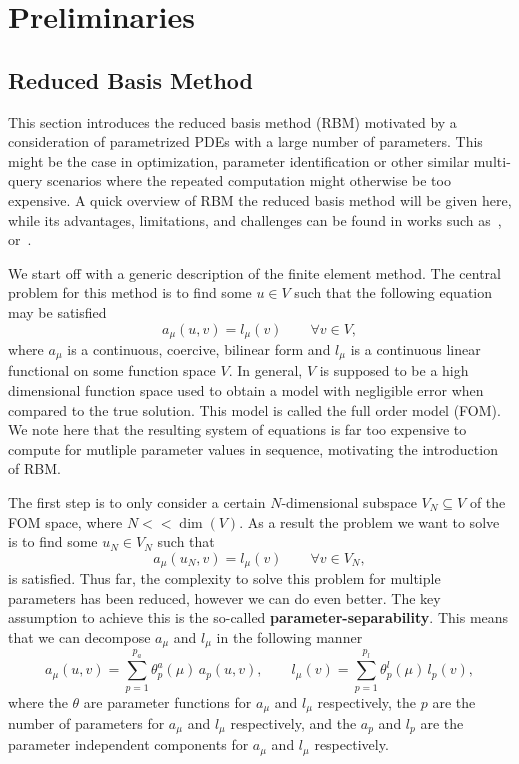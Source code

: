 \section{Preliminaries}\label{sec:Preliminaries}

\subsection{Reduced Basis Method}

This section introduces the reduced basis method (RBM) motivated by a consideration of parametrized PDEs with a large number of parameters.
This might be the case in optimization, parameter identification or other similar multi-query scenarios where the repeated computation might otherwise be too expensive.
A quick overview of RBM the reduced basis method will be given here, while its advantages, limitations, and challenges can be found in works such as~\cite{Ohlberger2015},~\cite{Quarteroni2015} or~\cite{Hesthaven2016}.

We start off with a generic description of the finite element method.
The central problem for this method is to find some $u \in V$ such that the following equation may be satisfied
\begin{equation}\label{FOMEq}
    a_\mu(u, v) = l_\mu(v) \qquad \forall v \in V,
\end{equation}
where $a_\mu$ is a continuous, coercive, bilinear form and $l_\mu$ is a continuous linear functional on some function space $V$.
In general, $V$ is supposed to be a high dimensional function space used to obtain a model with negligible error when compared to the true solution.
This model is called the full order model (FOM).
We note here that the resulting system of equations is far too expensive to compute for mutliple parameter values in sequence, motivating the introduction of RBM.\@

The first step is to only consider a certain $N$-dimensional subspace $V_N \subseteq V$ of the FOM space, where $N << \dim(V)$.
As a result the problem we want to solve is to find some $u_N \in V_N$ such that
\begin{equation}\label{ROMEq}
    a_\mu(u_N, v) = l_\mu(v) \qquad \forall v \in V_N,
\end{equation}
is satisfied.
Thus far, the complexity to solve this problem for multiple parameters has been reduced, however we can do even better.
The key assumption to achieve this is the so-called \textbf{parameter-separability}.
This means that we can decompose $a_\mu$ and $l_\mu$ in the following manner
\begin{equation}\label{ParamSep}
    a_\mu(u, v) = \sum\limits_{p = 1}^{p_a} \theta_p^a(\mu) \, a_p(u, v), \qquad l_\mu(v) = \sum\limits_{p = 1}^{p_l} \theta_p^l(\mu) \, l_p(v),
\end{equation}
where the $\theta$ are parameter functions for $a_\mu$ and $l_\mu$ respectively, the $p$ are the number of parameters for $a_\mu$ and $l_\mu$ respectively, and the $a_p$ and $l_p$ are the parameter independent components for $a_\mu$ and $l_\mu$ respectively.


